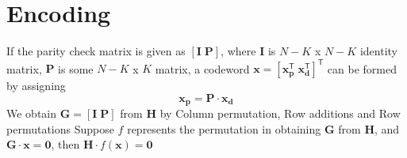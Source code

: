  \section{Encoding}
 If the parity check matrix is given as $\mathbf{\left[{I \; P}\right]}$, where $\mathbf{I}$ is $N - K$ x $N - K$ identity matrix, $\mathbf{P}$ is some $N - K$ x $K$ matrix,
   a codeword $\mathbf{x = \left[x_p^{\mathsf{T}} \; x_d^{\mathsf{T}}\right]^{\mathsf{T}}}$ can be formed by assigning
    \begin{equation}\nonumber
    \mathbf{x_p = P \cdot x_d}
    \end{equation}
   We obtain $\mathbf{G = \left[{I \; P}\right]}$ from $\mathbf{H}$ by Column permutation, Row additions and Row permutations
   Suppose $f$ represents the permutation in obtaining $\mathbf{G}$ from $\mathbf{H}$, and $\mathbf{G \cdot x = 0}$, then $\mathbf{H} \cdot f(\mathbf{x}) = \mathbf{0}$
